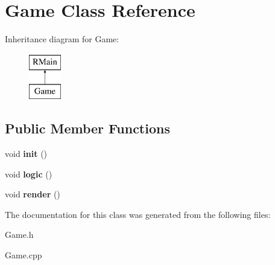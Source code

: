 \hypertarget{classGame}{
\section{Game Class Reference}
\label{classGame}
}
Inheritance diagram for Game:\begin{figure}[H]
\begin{center}
\leavevmode
\includegraphics[height=2.000000cm]{classGame}
\end{center}
\end{figure}
\subsection*{Public Member Functions}
\begin{DoxyCompactItemize}
\item 
\hypertarget{classGame_a6f3a33940524b6ba9d83f627ccb14bbf}{
void {\bfseries init} ()}
\label{classGame_a6f3a33940524b6ba9d83f627ccb14bbf}

\item 
\hypertarget{classGame_ae93d6615d19503966f6e20235adc6daf}{
void {\bfseries logic} ()}
\label{classGame_ae93d6615d19503966f6e20235adc6daf}

\item 
\hypertarget{classGame_a15ddd769261d923827a3cdf41499c843}{
void {\bfseries render} ()}
\label{classGame_a15ddd769261d923827a3cdf41499c843}

\end{DoxyCompactItemize}


The documentation for this class was generated from the following files:\begin{DoxyCompactItemize}
\item 
Game.h\item 
Game.cpp\end{DoxyCompactItemize}
